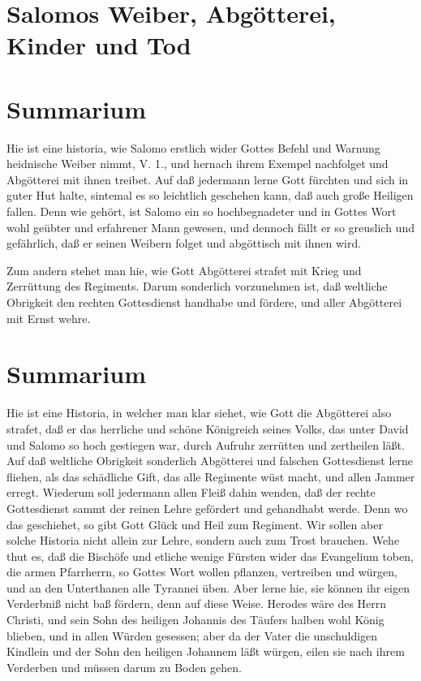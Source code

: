 \section{Salomos Weiber, Abgötterei, Kinder und Tod}

\section{Summarium}

Hie ist eine historia, wie Salomo erstlich wider Gottes Befehl und Warnung heidnische Weiber nimmt, V. 1., und hernach ihrem Exempel nachfolget und Abgötterei mit ihnen treibet. Auf daß jedermann lerne Gott fürchten und sich in guter Hut halte, sintemal es so leichtlich geschehen kann, daß auch große Heiligen fallen. Denn wie gehört, ist Salomo ein so hochbegnadeter und in Gottes Wort wohl geübter und erfahrener Mann gewesen, und dennoch fällt er so greuslich
 und gefährlich, daß er seinen Weibern folget und abgöttisch mit ihnen wird.

Zum andern stehet man hie, wie Gott Abgötterei strafet mit Krieg und Zerrüttung des Regiments. Darum sonderlich vorzunehmen ist, daß weltliche Obrigkeit den rechten Gottesdienst handhabe und fördere, und aller Abgötterei mit Ernst wehre.

\section{Summarium}

Hie ist eine Historia, in welcher man klar siehet, wie Gott die Abgötterei also strafet, daß er das herrliche und schöne Königreich seines Volks, das unter David und Salomo so hoch gestiegen war, durch Aufruhr zerrütten und zertheilen läßt. Auf daß weltliche Obrigkeit sonderlich Abgötterei und falschen Gottesdienst lerne fliehen, als das schädliche Gift, das alle Regimente wüst macht, und allen Jammer erregt. Wiederum soll jedermann allen Fleiß dahin wenden, daß der rechte Gottesdienst sammt der reinen Lehre gefördert und gehandhabt werde. Denn wo das geschiehet, so gibt Gott Glück und Heil zum Regiment. Wir sollen aber solche Historia nicht allein zur Lehre, sondern auch zum Trost brauchen. Wehe thut es, daß die Bischöfe und etliche wenige Fürsten wider das Evangelium toben, die armen Pfarrherrn, so Gottes Wort wollen pflanzen, vertreiben und würgen, und an den Unterthanen alle Tyrannei üben. Aber lerne hie, sie können ihr eigen Verderbniß
nicht baß fördern, denn auf diese Weise. Herodes wäre des Herrn Christi, und sein Sohn des heiligen Johannis des Täufers halben wohl König blieben, und in allen Würden gesessen; aber da der Vater die unschuldigen Kindlein und der Sohn den heiligen Johannem läßt würgen, eilen sie nach ihrem Verderben und müssen darum zu Boden gehen.

